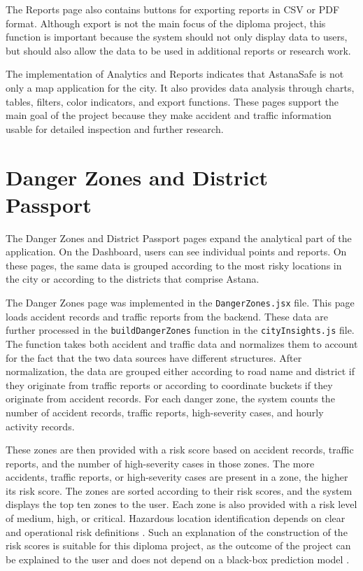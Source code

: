 ﻿\documentclass[12pt,a4paper]{report}
\begin{document}
The Reports page also contains buttons for exporting reports in CSV or PDF format. Although export is not the main focus of the diploma project, this function is important because the system should not only display data to users, but should also allow the data to be used in additional reports or research work.

The implementation of Analytics and Reports indicates that AstanaSafe is not only a map application for the city. It also provides data analysis through charts, tables, filters, color indicators, and export functions. These pages support the main goal of the project because they make accident and traffic information usable for detailed inspection and further research.

\section{Danger Zones and District Passport}

The Danger Zones and District Passport pages expand the analytical part of the application. On the Dashboard, users can see individual points and reports. On these pages, the same data is grouped according to the most risky locations in the city or according to the districts that comprise Astana.

The Danger Zones page was implemented in the \texttt{DangerZones.jsx} file. This page loads accident records and traffic reports from the backend. These data are further processed in the \texttt{buildDangerZones} function in the \texttt{cityInsights.js} file. The function takes both accident and traffic data and normalizes them to account for the fact that the two data sources have different structures. After normalization, the data are grouped either according to road name and district if they originate from traffic reports or according to coordinate buckets if they originate from accident records. For each danger zone, the system counts the number of accident records, traffic reports, high-severity cases, and hourly activity records.

These zones are then provided with a risk score based on accident records, traffic reports, and the number of high-severity cases in those zones. The more accidents, traffic reports, or high-severity cases are present in a zone, the higher its risk score. The zones are sorted according to their risk scores, and the system displays the top ten zones to the user. Each zone is also provided with a risk level of medium, high, or critical. Hazardous location identification depends on clear and operational risk definitions \cite{elvik2008}. Such an explanation of the construction of the risk scores is suitable for this diploma project, as the outcome of the project can be explained to the user and does not depend on a black-box prediction model \cite{lord2010}.
\end{document}
